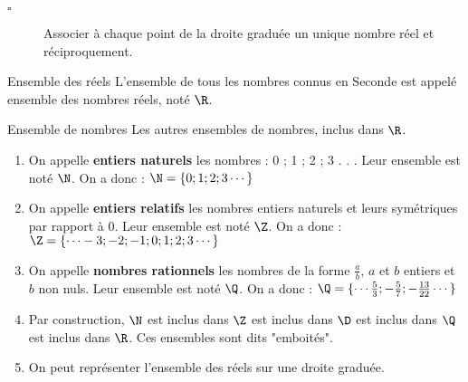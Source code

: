 \begin{titre}

\end{titre}


\begin{CpsCol}
\begin{description}
\item[$\square$] Associer à chaque point de la droite graduée un unique nombre réel et
réciproquement.
\end{description}
\end{CpsCol}




\begin{DefT}{Ensemble des réels}
L'ensemble de tous les nombres connus en Seconde est appelé ensemble des nombres réels, noté $\R$.
\end{DefT}

\begin{DefT}{Ensemble de nombres}
Les autres ensembles de nombres, inclus dans $\R$.
\begin{enumerate}
\item On appelle \textbf{entiers naturels} les nombres : 0 ; 1 ; 2 ; 3 . . . Leur ensemble est noté $\N$.
On a donc : $\N = \lbrace 0 ; 1 ; 2 ; 3 \cdots \rbrace $
\item  On appelle \textbf{entiers relatifs} les nombres entiers naturels et leurs symétriques par rapport à 0. Leur ensemble est noté $\Z$.
On a donc : $\Z = \lbrace \cdots -3 ; -2 ; -1 ; 0 ; 1 ; 2 ; 3  \cdots \rbrace $
\item  On appelle \textbf{nombres rationnels} les nombres de la forme $\frac{a}{b}$, $a$ et $b$ entiers et $b$ non nuls.  Leur ensemble est noté $\Q$. 
On a donc : $\Q = \lbrace \cdots \frac{5}{3} ; -\frac{5}{7} ; -\frac{13}{22} \cdots \rbrace$
\item Par construction, $\N$ est inclus dans $\Z$  est inclus dans $\D$  est inclus dans $\Q$  est inclus dans $\R$. Ces ensembles sont dits "emboités".
\item  On peut représenter l'ensemble des réels sur une droite graduée.
\begin{center}
 \end{center} 
\end{enumerate}
\end{DefT}


